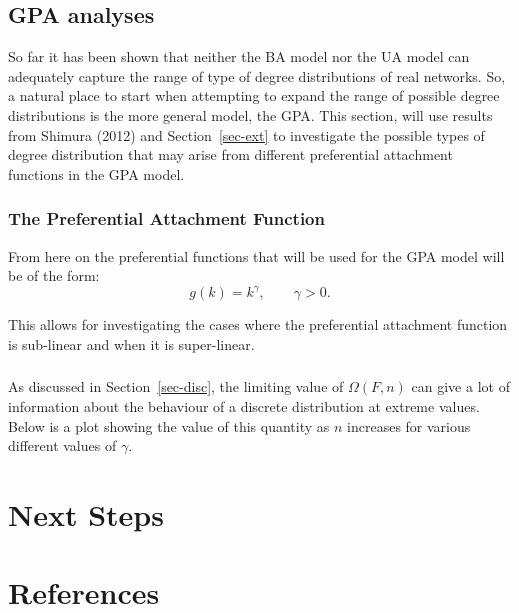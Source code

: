 \documentclass[
  10pt,
  a4paper,
]{scrreprt}
\theoremstyle{plain}
\theoremstyle{definition}
\theoremstyle{remark}
\begin{document}
{\hypertarget{gpa-analyses}{%
\section{GPA analyses}\label{gpa-analyses}}

So far it has been shown that neither the BA model nor the UA model can
adequately capture the range of type of degree distributions of real
networks. So, a natural place to start when attempting to expand the
range of possible degree distributions is the more general model, the
GPA. This section, will use results from Shimura (2012) and
Section~\ref{sec-ext} to investigate the possible types of degree
distribution that may arise from different preferential attachment
functions in the GPA model.

\hypertarget{the-preferential-attachment-function}{%
\subsection{The Preferential Attachment
Function}\label{the-preferential-attachment-function}}

From here on the preferential functions that will be used for the GPA
model will be of the form: \[
g(k) = k^\gamma, \qquad \gamma>0.
\]

This allows for investigating the cases where the preferential
attachment function is sub-linear and when it is super-linear.

\hypertarget{section}{%
\subsection{}\label{section}}

As discussed in Section~\ref{sec-disc}, the limiting value of
\(\Omega(F,n)\) can give a lot of information about the behaviour of a
discrete distribution at extreme values. Below is a plot showing the
value of this quantity as \(n\) increases for various different values
of \(\gamma\).

\hypertarget{next-steps}{%
\chapter{Next Steps}\label{next-steps}}

\newpage{}

\hypertarget{references}{%
\chapter*{References}\label{references}}

}
\end{document}
